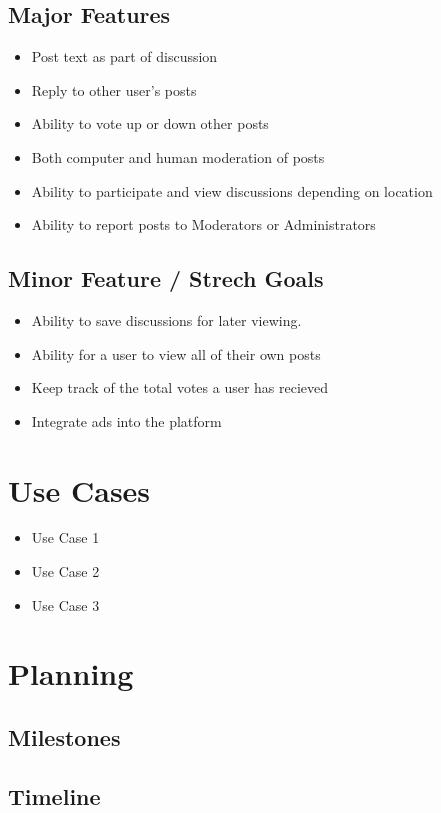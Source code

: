 \documentclass[12pt]{article}
\begin{document}
\subsection{Major Features}
\begin{itemize}
      \item Post text as part of discussion
      \item Reply to other user's posts
      \item Ability to vote up or down other posts
      \item Both computer and human moderation of posts
      \item Ability to participate and view discussions depending on location
      \item Ability to report posts to Moderators or Administrators
\end{itemize}
\subsection{Minor Feature / Strech Goals}
\begin{itemize}
      \item Ability to save discussions for later viewing.
      \item Ability for a user to view all of their own posts
      \item Keep track of the total votes a user has recieved
      \item Integrate ads into the platform
\end{itemize}
\section{Use Cases}

\begin{itemize}
  \item Use Case 1
  \item Use Case 2
  \item Use Case 3
\end{itemize}

\section{Planning}

\subsection{Milestones}
\subsection{Timeline}
\end{document}

